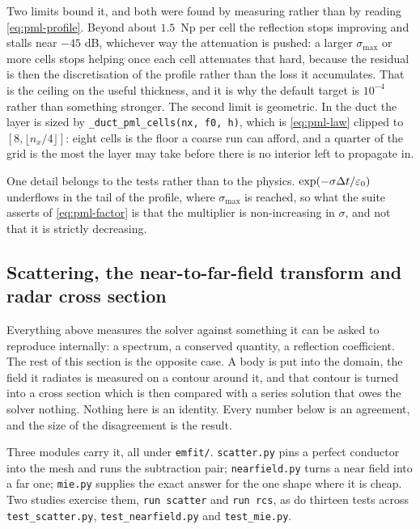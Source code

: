 Two limits bound it, and both were found by measuring rather than by reading \eqref{eq:pml-profile}. Beyond
about $1.5$~Np per cell the reflection stops improving and stalls near $-45$ dB, whichever way the attenuation
is pushed: a larger $\sigma_{\max}$ or more cells stops helping once each cell attenuates that hard, because
the residual is then the discretisation of the profile rather than the loss it accumulates. That is the ceiling
on the useful thickness, and it is why the default target is $10^{-4}$ rather than something stronger. The
second limit is geometric. In the duct the layer is sized by \texttt{\_duct\_pml\_cells(nx, f0, h)}, which is
\eqref{eq:pml-law} clipped to $[8, \lfloor n_x/4\rfloor]$: eight cells is the floor a coarse run can afford,
and a quarter of the grid is the most the layer may take before there is no interior left to propagate in.

One detail belongs to the tests rather than to the physics. $\exp(-\sigma\Delta t/\varepsilon_0)$ underflows in the
tail of the profile, where $\sigma_{\max}$ is reached, so what the suite asserts of \eqref{eq:pml-factor} is
that the multiplier is non-increasing in $\sigma$, and not that it is strictly decreasing.

\subsection{Scattering, the near-to-far-field transform and radar cross section}
\label{sec:res-scatter}

Everything above measures the solver against something it can be asked to reproduce internally: a spectrum, a
conserved quantity, a reflection coefficient. The rest of this section is the opposite case. A body is put
into the domain, the field it radiates is measured on a contour around it, and that contour is turned into a
cross section which is then compared with a series solution that owes the solver nothing. Nothing here is an
identity. Every number below is an agreement, and the size of the disagreement is the result.

Three modules carry it, all under \texttt{emfit/}. \texttt{scatter.py} pins a perfect conductor into the mesh
and runs the subtraction pair; \texttt{nearfield.py} turns a near field into a far one; \texttt{mie.py}
supplies the exact answer for the one shape where it is cheap. Two studies exercise them, \texttt{run scatter}
and \texttt{run rcs}, as do thirteen tests across \texttt{test\_scatter.py}, \texttt{test\_nearfield.py} and
\texttt{test\_mie.py}.

